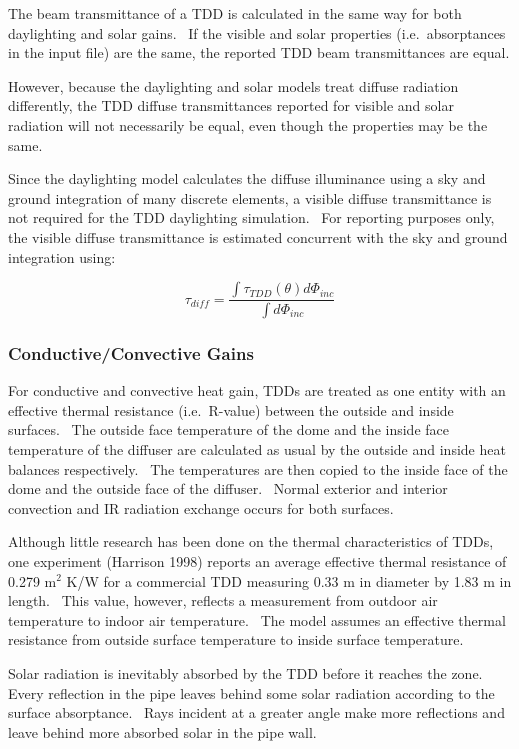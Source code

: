 The beam transmittance of a TDD is calculated in the same way for both daylighting and solar gains.~ If the visible and solar properties (i.e.~absorptances in the input file) are the same, the reported TDD beam transmittances are equal.

However, because the daylighting and solar models treat diffuse radiation differently, the TDD diffuse transmittances reported for visible and solar radiation will not necessarily be equal, even though the properties may be the same.

Since the daylighting model calculates the diffuse illuminance using a sky and ground integration of many discrete elements, a visible diffuse transmittance is not required for the TDD daylighting simulation.~ For reporting purposes only, the visible diffuse transmittance is estimated concurrent with the sky and ground integration using:

\begin{equation}
{\tau_{diff}} = \frac{{\int {{\tau_{TDD}}(\theta )d{\Phi_{inc}}} }}{{\int {d{\Phi_{inc}}} }}
\end{equation}

\subsubsection{Conductive/Convective Gains}\label{conductiveconvective-gains}

For conductive and convective heat gain, TDDs are treated as one entity with an effective thermal resistance (i.e.~R-value) between the outside and inside surfaces.~ The outside face temperature of the dome and the inside face temperature of the diffuser are calculated as usual by the outside and inside heat balances respectively.~ The temperatures are then copied to the inside face of the dome and the outside face of the diffuser.~ Normal exterior and interior convection and IR radiation exchange occurs for both surfaces.

Although little research has been done on the thermal characteristics of TDDs, one experiment (Harrison 1998) reports an average effective thermal resistance of 0.279 m\(^{2}\) K/W for a commercial TDD measuring 0.33 m in diameter by 1.83 m in length.~ This value, however, reflects a measurement from outdoor air temperature to indoor air temperature.~ The model assumes an effective thermal resistance from outside surface temperature to inside surface temperature.

Solar radiation is inevitably absorbed by the TDD before it reaches the zone.~ Every reflection in the pipe leaves behind some solar radiation according to the surface absorptance.~ Rays incident at a greater angle make more reflections and leave behind more absorbed solar in the pipe wall.

